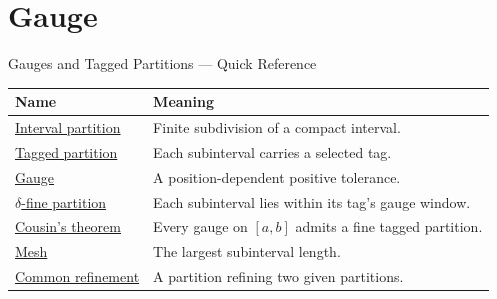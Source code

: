 
\section{Gauge}

\begin{toolkitbox}{Gauges and Tagged Partitions --- Quick Reference}
\small
\begin{tabular}{l l}
\toprule
\textbf{Name} & \textbf{Meaning}\\
\midrule
\hyperref[def:interval-partition]{Interval partition} & Finite subdivision of a compact interval.\\
\hyperref[def:tagged-partition]{Tagged partition} & Each subinterval carries a selected tag.\\
\hyperref[def:gauge]{Gauge} & A position-dependent positive tolerance.\\
\hyperref[def:delta-fine-partition]{$\delta$-fine partition} & Each subinterval lies within its tag's gauge window.\\
\hyperref[thm:cousins-theorem]{Cousin's theorem} & Every gauge on $[a,b]$ admits a fine tagged partition.\\
\hyperref[def:mesh-of-partition]{Mesh} & The largest subinterval length.\\
\hyperref[def:common-refinement]{Common refinement} & A partition refining two given partitions.\\
\bottomrule
\end{tabular}
\end{toolkitbox}




